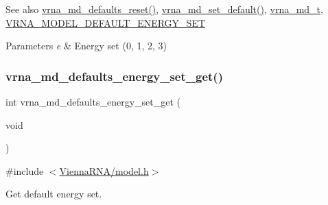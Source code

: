 \begin{DoxySeeAlso}{See also}
\hyperlink{group__model__details_ga70834424cf804d149937de89f80ceb45}{vrna\+\_\+md\+\_\+defaults\+\_\+reset()}, \hyperlink{group__model__details_ga8ac6ff84936282436f822644bf841f66}{vrna\+\_\+md\+\_\+set\+\_\+default()}, \hyperlink{group__model__details_ga1f8a10e12a0a1915f2a4eff0b28ea17c}{vrna\+\_\+md\+\_\+t}, \hyperlink{group__model__details_ga6fcf6b2d0f89256cdbd166486c9b6e1e}{V\+R\+N\+A\+\_\+\+M\+O\+D\+E\+L\+\_\+\+D\+E\+F\+A\+U\+L\+T\+\_\+\+E\+N\+E\+R\+G\+Y\+\_\+\+S\+ET} 
\end{DoxySeeAlso}

\begin{DoxyParams}{Parameters}
{\em e} & Energy set (0, 1, 2, 3) \\
\hline
\end{DoxyParams}
\mbox{\label{group__model__details_ga017ed6afb1cba2b7f242412cab618b53}} 
\subsubsection{\texorpdfstring{vrna\+\_\+md\+\_\+defaults\+\_\+energy\+\_\+set\+\_\+get()}{vrna\_md\_defaults\_energy\_set\_get()}}
{\footnotesize\ttfamily int vrna\+\_\+md\+\_\+defaults\+\_\+energy\+\_\+set\+\_\+get (\begin{DoxyParamCaption}\item[{void}]{ }\end{DoxyParamCaption})}



{\ttfamily \#include $<$\hyperlink{model_8h}{Vienna\+R\+N\+A/model.\+h}$>$}



Get default energy set. 


